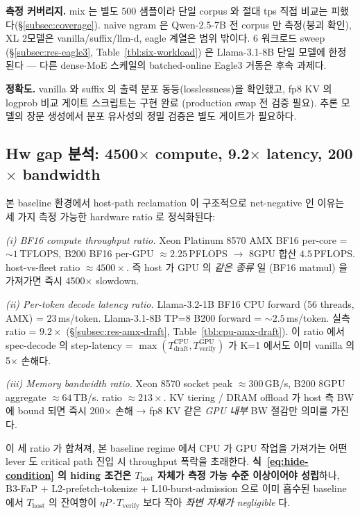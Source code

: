 \textbf{측정 커버리지.}
mix 는 별도 500 샘플이라 단일 corpus 와 절대 tps 직접 비교는 피했다(\S\ref{subsec:coverage}).
naive ngram 은 Qwen-2.5-7B 전 corpus 만 측정(붕괴 확인), XL 2모델은 vanilla/suffix/llm-d,
eagle 계열은 범위 밖이다.
6 워크로드 sweep (\S\ref{subsec:res-eagle3}, Table~\ref{tbl:six-workload}) 은 Llama-3.1-8B 단일 모델에 한정된다 ---
다른 dense$\cdot$MoE 스케일의 batched-online Eagle3 거동은 후속 과제다.

\textbf{정확도.}
vanilla 와 suffix 의 출력 분포 동등(losslessness)을 확인했고,
fp8 KV 의 logprob 비교 게이트 스크립트는 구현 완료 (production swap 전 검증 필요).
추론 모델의 장문 생성에서 분포 유사성의 정밀 검증은 별도 게이트가 필요하다.

\subsection{Hw gap 분석: 4500$\times$ compute, 9.2$\times$ latency, 200$\times$ bandwidth}
\label{subsec:hw-gap-analysis}

본 baseline 환경에서 host-path reclamation 이 구조적으로 net-negative 인 이유는
세 가지 측정 가능한 hardware ratio 로 정식화된다:

\textit{(i) BF16 compute throughput ratio.}
Xeon Platinum 8570 AMX BF16 per-core = $\sim\!1$\,TFLOPS, B200 BF16 per-GPU $\approx\!2.25$\,PFLOPS
$\to$ 8GPU 합산 $4.5$\,PFLOPS. host-vs-fleet ratio
$\approx\!4500\!\times$. 즉 host 가 GPU 의 \emph{같은 종류} 일 (BF16 matmul) 을 가져가면
즉시 4500$\times$ slowdown.

\textit{(ii) Per-token decode latency ratio.}
Llama-3.2-1B BF16 CPU forward (56 threads, AMX) = $23$\,ms/token.
Llama-3.1-8B TP=8 B200 forward = $\sim\!2.5$\,ms/token.
실측 ratio = $9.2\!\times$ (\S\ref{subsec:res-amx-draft}, Table~\ref{tbl:cpu-amx-draft}).
이 ratio 에서 spec-decode 의 step-latency = $\max(T_{\mathrm{draft}}^{\mathrm{CPU}}, T_{\mathrm{verify}}^{\mathrm{GPU}})$
가 K=1 에서도 이미 vanilla 의 5$\times$ 손해다.

\textit{(iii) Memory bandwidth ratio.}
Xeon 8570 socket peak $\approx\!300$\,GB/s, B200 8GPU aggregate $\approx\!64$\,TB/s.
ratio $\approx\!213\!\times$. KV tiering / DRAM offload 가 host 측 BW 에 bound 되면
즉시 200$\times$ 손해 → fp8 KV 같은 \emph{GPU 내부} BW 절감만 의미를 가진다.

이 세 ratio 가 합쳐져, 본 baseline regime 에서 CPU 가 GPU 작업을 가져가는 어떤 lever 도
critical path 진입 시 throughput 폭락을 초래한다.
\textbf{식~\ref{eq:hide-condition} 의 hiding 조건은 $T_{\mathrm{host}}$ 자체가 측정 가능 수준 이상이어야
성립}하나, B3-FaP $+$ L2-prefetch-tokenize $+$ L10-burst-admission 으로 이미 흡수된 baseline 에서
$T_{\mathrm{host}}$ 의 잔여항이 $\eta P \cdot T_{\mathrm{verify}}$ 보다 작아 \emph{좌변 자체가 negligible} 다.

